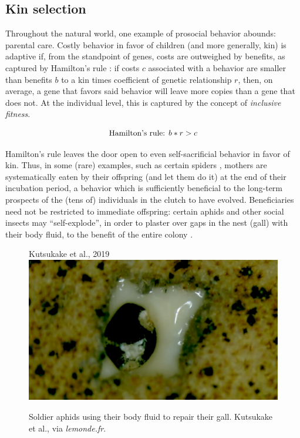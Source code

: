 \documentclass[a4paper,12pt]{report}
\begin{document}
\subsection{Kin selection}
\label{s:kin}
Throughout the natural world, one example of prosocial behavior abounds: parental care.
Costly behavior in favor of children (and more generally, kin) is adaptive if,
from the standpoint of genes, costs are outweighed by benefits,
as captured by Hamilton’s rule \citeyear{hamilton_genetical_1964}: if costs $c$ associated with a behavior are
smaller than benefits $b$ to a kin times coefficient of genetic relationship $r$,
then, on average, a gene that favors said behavior will leave more copies than a
gene that does not. At the individual level, this is captured by the concept of
\emph{inclusive fitness}.

 \[\textnormal{Hamilton's rule: }b*r > c\]

Hamilton’s rule leaves the door open to even self-sacrificial behavior in favor of kin.
Thus, in some (rare) examples, such as certain spiders \cite{kim_functional_2000},
mothers are systematically eaten by their offspring (and let them do it) at the end of
their incubation period, a behavior which is sufficiently beneficial to the long-term
prospects of the (tens of) individuals in the clutch to have evolved. Beneficiaries
need not be restricted to immediate offspring: certain aphids and other social insects
may “self-explode”, in order to plaster over gaps in the nest (gall) with their body fluid,
to the benefit of the entire colony \cite{kutsukake_exaggeration_2019}.

\begin{figure}[]Kutsukake et al., 2019
    \centering
    \includegraphics[width=1\textwidth]{aphid}
    \caption{Soldier aphids using their body fluid to repair their gall. Kutsukake et al.,
    via \textit{lemonde.fr}.}
    \label{}
\end{figure}
    
\end{document}
